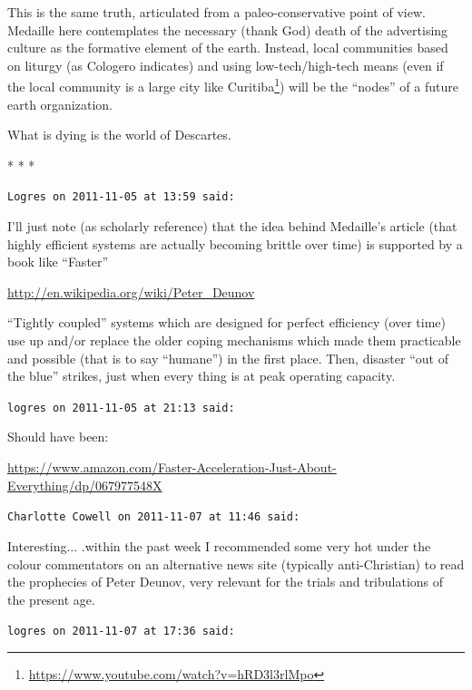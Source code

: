 This is the same truth, articulated from a paleo-conservative point of view. Medaille here contemplates the necessary (thank God) death of the advertising culture as the formative element of the earth. Instead, local communities based on liturgy (as Cologero indicates) and using low-tech/high-tech means (even if the local community is a large city like Curitiba\footnote{\url{https://www.youtube.com/watch?v=hRD3l3rlMpo}}) will be the ``nodes'' of a future earth organization.

What is dying is the world of Descartes.



\begin{center}* * *\end{center}

\begin{footnotesize}
\begin{sffamily}
\texttt{Logres on 2011-11-05 at 13:59 said:}

I'll just note (as scholarly reference) that the idea behind Medaille's article (that highly efficient systems are actually becoming brittle over time) is supported by a book like ``Faster''

\url{http://en.wikipedia.org/wiki/Peter\_Deunov}

``Tightly coupled'' systems which are designed for perfect efficiency (over time) use up and/or replace the older coping mechanisms which made them practicable and possible (that is to say ``humane'') in the first place. Then, disaster ``out of the blue'' strikes, just when every thing is at peak operating capacity.

\hfill

\texttt{logres on 2011-11-05 at 21:13 said:}

Should have been:

\url{https://www.amazon.com/Faster-Acceleration-Just-About-Everything/dp/067977548X}


\hfill

\texttt{Charlotte Cowell on 2011-11-07 at 11:46 said:}

Interesting... .within the past week I recommended some very hot under the colour commentators on an alternative news site (typically anti-Christian) to read the prophecies of Peter Deunov, very relevant for the trials and tribulations of the present age.

\hfill

\texttt{logres on 2011-11-07 at 17:36 said:}


\end{sffamily}
\end{footnotesize}
